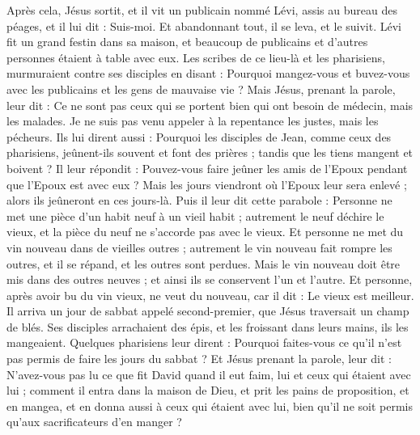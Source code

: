\begin{multicols}{2}
Après cela, Jésus sortit, et il vit un publicain nommé Lévi, assis au bureau des péages, et il lui dit : Suis-moi.
Et abandonnant tout, il se leva, et le suivit.
Lévi fit un grand festin dans sa maison, et beaucoup de publicains et d’autres personnes étaient à table avec eux.
Les scribes de ce lieu-là et les pharisiens, murmuraient contre ses disciples en disant : Pourquoi mangez-vous et buvez-vous avec les publicains et les gens de mauvaise vie ?
Mais Jésus, prenant la parole, leur dit : Ce ne sont pas ceux qui se portent bien qui ont besoin de médecin, mais les malades.
Je ne suis pas venu appeler à la repentance les justes, mais les pécheurs.
Ils lui dirent aussi : Pourquoi les disciples de Jean, comme ceux des pharisiens, jeûnent-ils souvent et font des prières ; tandis que les tiens mangent et boivent ?
Il leur répondit : Pouvez-vous faire jeûner les amis de l'Epoux pendant que l'Epoux est avec eux ?
Mais les jours viendront où l'Epoux leur sera enlevé ; alors ils jeûneront en ces jours-là.
Puis il leur dit cette parabole : Personne ne met une pièce d'un habit neuf à un vieil habit ; autrement le neuf déchire le vieux, et la pièce du neuf ne s’accorde pas avec le vieux.
Et personne ne met du vin nouveau dans de vieilles outres ; autrement le vin nouveau fait rompre les outres, et il se répand, et les outres sont perdues.
Mais le vin nouveau doit être mis dans des outres neuves ; et ainsi ils se conservent l'un et l'autre.
Et personne, après avoir bu du vin vieux, ne veut du nouveau, car il dit : Le vieux est meilleur.
\VerseOne{}Il arriva un jour de sabbat appelé second-premier, que Jésus traversait un champ de blés. Ses disciples arrachaient des épis, et les froissant dans leurs mains, ils les mangeaient.
Quelques pharisiens leur dirent : Pourquoi faites-vous ce qu’il n’est pas permis de faire les jours du sabbat ?
Et Jésus prenant la parole, leur dit : N'avez-vous pas lu ce que fit David quand il eut faim, lui et ceux qui étaient avec lui ;
comment il entra dans la maison de Dieu, et prit les pains de proposition, et en mangea, et en donna aussi à ceux qui étaient avec lui, bien qu’il ne soit permis qu'aux sacrificateurs d'en manger ?

\end{multicols}
